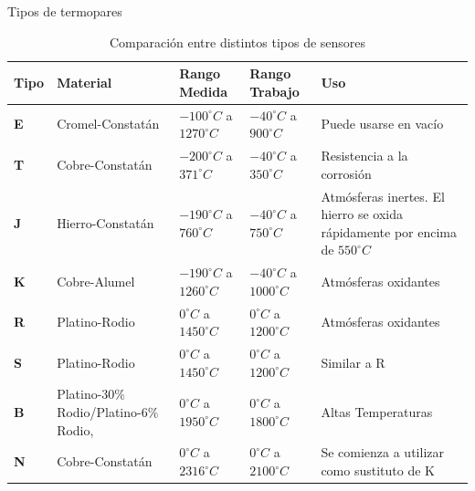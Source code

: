 \documentclass[aspectratio=169]{beamer}
\begin{document}
\begin{frame}{Tipos de termopares}
  \begin{table}[]
    \centering
    \footnotesize{
    \begin{tabular}{m{0.6cm}|m{2.6cm}|m{2.5cm}|m{2.4cm} | m{3.6cm}}
     \hline
         \hline
        \textbf{Tipo} & \textbf{Material} &\textbf{Rango Medida} & \textbf{Rango Trabajo} & \textbf{Uso} \\
         \hline
         \hline
       \textbf{E} & Cromel-Constatán & $-100 ^{\circ} C$ a $ 1270^{\circ} C$ & $-40 ^{\circ} C$ a $900^{\circ} C$ & Puede usarse en vacío\\
       \textbf{T} & Cobre-Constatán & $-200 ^{\circ} C$ a $ 371^{\circ} C$ & $-40 ^{\circ} C$ a $350 ^{\circ} C$ & Resistencia a la corrosión\\
       \textbf{J} & Hierro-Constatán & $-190 ^{\circ} C$ a $ 760^{\circ} C$ & $-40 ^{\circ} C$ a $750 ^{\circ} C$ & Atmósferas inertes. El hierro se oxida rápidamente por encima de $550 ^{\circ}C$\\
       \textbf{K} & Cobre-Alumel & $-190 ^{\circ} C$ a $ 1260^{\circ} C$ & $-40 ^{\circ} C$ a $1000 ^{\circ} C$ & Atmósferas oxidantes\\
       \textbf{R} & Platino-Rodio & $0 ^{\circ} C$ a $ 1450^{\circ} C$ & $0 ^{\circ} C$ a $1200 ^{\circ} C$ & Atmósferas oxidantes\\
       \textbf{S} & Platino-Rodio & $0 ^{\circ} C$ a $ 1450^{\circ} C$ & $0 ^{\circ} C$ a $1200 ^{\circ} C$ & Similar a R\\
       \textbf{B} & Platino-$30\%$ Rodio/Platino-$6\%$ Rodio, & $0 ^{\circ} C$ a $ 1950^{\circ} C$ & $0 ^{\circ} C$ a $1800 ^{\circ} C$ & Altas Temperaturas\\
       \textbf{N} & Cobre-Constatán & $0 ^{\circ} C$ a $ 2316^{\circ} C$ & $0 ^{\circ} C$ a $2100 ^{\circ} C$ & Se comienza a utilizar como sustituto de K\\
    \end{tabular}
    }
    \caption{Comparación entre distintos tipos de sensores\cite{sole2005instrumentacion}}
    \label{tab:Comparacion_termo}
\end{table}
\end{frame}
\end{document}
